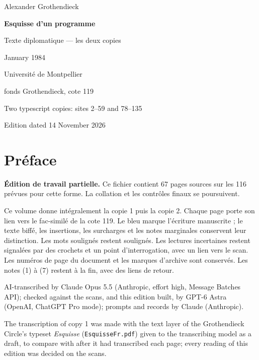 \documentclass[11pt,a4paper]{article}
\newcommand{\EditionTitle}{Esquisse d'un programme}
\newcommand{\EditionForm}{Texte diplomatique — les deux copies}
\begin{document}
\begin{titlepage}
\centering
\vspace*{18mm}
{\Large Alexander Grothendieck\par}
\vspace{12mm}
{\Huge\bfseries\EditionTitle\par}
\vspace{8mm}
{\Large\EditionForm\par}
\vspace{14mm}
{\large January 1984\par}
\vfill
{\large Université de Montpellier\par fonds Grothendieck, cote 119\par}
\vspace{8mm}
{\normalsize Two typescript copies: sites 2--59 and 78--135\par}
\vspace{8mm}
{\normalsize Edition dated 14 November 2026\par}
\end{titlepage}
\thispagestyle{plain}
\section*{Préface}
\noindent\textbf{Édition de travail partielle.} Ce fichier contient 67 pages sources sur les 116 prévues pour cette forme. La collation et les contrôles finaux se poursuivent.\par\smallskip
Ce volume donne intégralement la copie 1 puis la copie 2. Chaque page porte son lien vers le fac-similé de la cote 119. Le bleu marque l’écriture manuscrite ; le texte biffé, les insertions, les surcharges et les notes marginales conservent leur distinction. Les mots soulignés restent soulignés. Les lectures incertaines restent signalées par des crochets et un point d’interrogation, avec un lien vers le scan. Les numéros de page du document et les marques d’archive sont conservés. Les notes (1) à (7) restent à la fin, avec des liens de retour.

\smallskip
AI-transcribed by Claude Opus 5.5 (Anthropic, effort high, Message Batches API); checked against the scans, and this edition built, by GPT-6 Astra (OpenAI, ChatGPT Pro mode); prompts and records by Claude (Anthropic).


The transcription of copy 1 was made with the text layer of the Grothendieck Circle's typeset \textit{Esquisse} (\texttt{EsquisseFr.pdf}) given to the transcribing model as a draft, to compare with after it had transcribed each page; every reading of this edition was decided on the scans.
\end{document}
